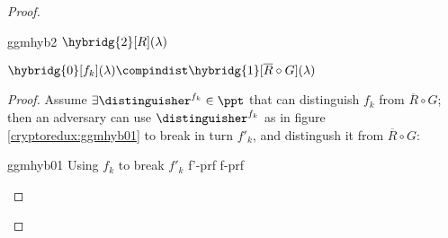 \begin{proof}
\begin{cryptogame}

    \end{cryptogame}

    \begin{cryptogame}
        {ggmhyb2}
        {$\hybridg{2}[R](\lambda)$}
        {}


    \end{cryptogame}
    

    \begin{lemma}
        $\hybridg{0}[f_k](\lambda) \compindist \hybridg{1}[\overline{R} \circ G](\lambda)$       
    \end{lemma}

    \begin{proof}
        Assume $\exists \distinguisher^{f_k} \in \ppt$ that can distinguish $f_k$ from $\overline{R} \circ G$; then an adversary \adversary{} can use $\distinguisher^{f_k}$ as in figure \ref{cryptoredux:ggmhyb01} to break in turn $f'_k$, and distingush it from $\overline{R} \circ G$:

        \begin{cryptoredux}
            {ggmhyb01}
            {Using $f_k$ to break $f'_k$}
            {f'-prf}
            {f-prf}





\end{cryptoredux}
\end{proof}
\end{proof}
